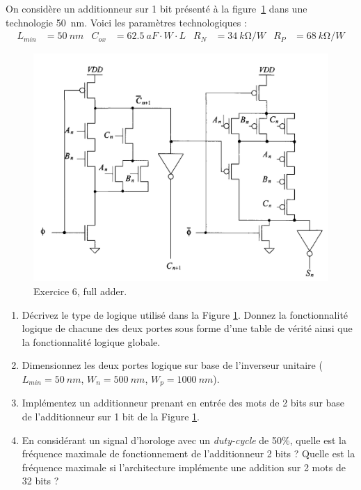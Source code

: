 \documentclass[frenchb,DIV=14]{scrartcl}
\begin{document}
On considère un additionneur sur 1 bit présenté à la figure~\ref{fig9-3} dans
une technologie \SI{50}{nm}. Voici les paramètres technologiques :
\begin{align*}
    L_{min} &= \SI{50}{nm} &
    C_{ox} &= \SI{62.5}{aF}\cdot W\cdot L &
    R_N&=\SI{34}{k\ohm}/W &
    R_P&=\SI{68}{k\ohm}/W 
\end{align*}

\begin{figure}
	\centering
	\includegraphics[width=13cm]{figures/fig9-3.png}
	\caption{Exercice 6, full adder.}
	\label{fig9-3}
\end{figure}

\begin{enumerate}
	\item Décrivez le type de logique utilisé dans la Figure \ref{fig9-3}.
	Donnez la fonctionnalité logique de chacune des deux portes sous forme d'une
	table de vérité ainsi que la fonctionnalité logique globale.
	\item Dimensionnez les deux portes logique sur base de l'inverseur
    unitaire ($L_{min}=\SI{50}{nm}$, $W_{n}=\SI{500}{nm}$, $W_{p}=\SI{1000}{nm}$).
	\item Implémentez un additionneur prenant en entrée des mots de 2 bits sur
	base de l'additionneur sur 1 bit de la Figure \ref{fig9-3}.
	\item En considérant un signal d'horologe avec un \emph{duty-cycle} de 50\%,
	quelle est la fréquence maximale de fonctionnement de l'additionneur 2 bits ?
	Quelle est la fréquence maximale si l'architecture implémente une addition sur
	2 mots de 32 bits ?
\end{enumerate}
\end{document}
